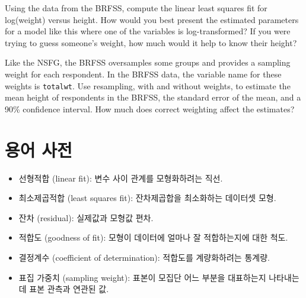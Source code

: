 \begin{exercise}

Using the data from the BRFSS, compute the linear least squares
fit for log(weight) versus height.
How would you best present the estimated parameters for a model
like this where one of the variables is log-transformed?
If you were trying to guess
someone's weight, how much would it help to know their height?

Like the NSFG, the BRFSS oversamples some groups and provides
a sampling weight for each respondent.  In the BRFSS data, the variable
name for these weights is {\tt totalwt}.
Use resampling, with and without weights, to estimate the mean height
of respondents in the BRFSS, the standard error of the mean, and a
90\% confidence interval.  How much does correct weighting affect the
estimates?
\end{exercise}


\section{용어 사전}

\begin{itemize}

\item 선형적합 (linear fit): 변수 사이 관계를 모형화하려는 직선.

\item 최소제곱적합 (least squares fit): 잔차제곱합을 최소화하는 데이터셋 모형.

\item 잔차 (residual): 실제값과 모형값 편차.

\item 적합도 (goodness of fit): 모형이 데이터에 얼마나 잘 적합하는지에 대한 척도.

\item 결정계수 (coefficient of determination): 적합도를 계량화하려는 통계량.

\item 표집 가중치 (sampling weight): 
표본이 모집단 어느 부분을 대표하는지 나타내는데 표본 관측과 연관된 값.

\end{itemize}

